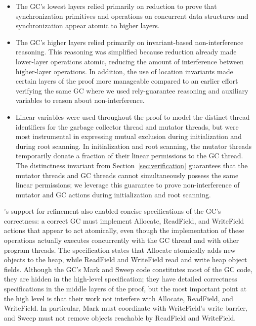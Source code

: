 \begin{itemize}
\item The GC's lowest layers relied primarily on reduction to
prove that synchronization primitives and operations on
concurrent data structures and synchronization appear atomic
to higher layers.

\item The GC's higher layers relied primarily on invariant-based non-interference reasoning.
This reasoning was simplified because reduction already made lower-layer operations atomic,
reducing the amount of interference between higher-layer operations.
In addition, the use of location invariants made certain layers of the proof more
manageable compared to an earlier effort verifying the same GC where we used
rely-guarantee reasoning and auxiliary variables to reason about
non-interference.  

\item Linear variables were used throughout the proof to model the distinct
thread identifiers for the garbage collector thread and mutator
threads, but were most instrumental in expressing mutual exclusion
during initialization and during root scanning.
In initialization and root scanning,
the mutator threads temporarily donate a fraction of their linear permissions to the GC thread.
The distinctness invariant from Section~\ref{sec:verification} guarantees
that the mutator threads and GC threads cannot simultaneously possess the same linear permissions;
we leverage this guarantee to prove non-interference of mutator and GC actions during initialization and root scanning.

\end{itemize}

\civl's support for refinement also enabled concise specifications of the GC's correctness:
a correct GC must implement Allocate, ReadField, and WriteField actions that appear to act atomically,
even though the implementation of these operations actually executes concurrently with the GC thread and with other program threads.
The specification states that Allocate atomically adds new objects to the heap,
while ReadField and WriteField read and write heap object fields.
Although the GC's Mark and Sweep code constitutes most of the GC code,
they are hidden in the high-level specification;
they have detailed correctness specifications in the middle layers of the proof,
but the most important point at the high level is that their work not interfere with Allocate, ReadField, and WriteField.
In particular, Mark must coordinate with WriteField's write barrier,
and Sweep must not remove objects reachable by ReadField and WriteField.

